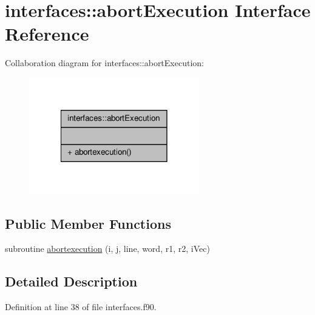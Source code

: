 \hypertarget{interfaceinterfaces_1_1abort_execution}{\section{interfaces\-:\-:abort\-Execution Interface Reference}
\label{interfaceinterfaces_1_1abort_execution}
}


Collaboration diagram for interfaces\-:\-:abort\-Execution\-:\nopagebreak
\begin{figure}[H]
\begin{center}
\leavevmode
\includegraphics[width=210pt]{interfaceinterfaces_1_1abort_execution__coll__graph}
\end{center}
\end{figure}
\subsection*{Public Member Functions}
\begin{DoxyCompactItemize}
\item 
subroutine \hyperlink{interfaceinterfaces_1_1abort_execution_a80e28af83055359ee64f57fb1a7fa48b}{abortexecution} (i, j, line, word, r1, r2, i\-Vec)
\end{DoxyCompactItemize}


\subsection{Detailed Description}


Definition at line 38 of file interfaces.\-f90.



